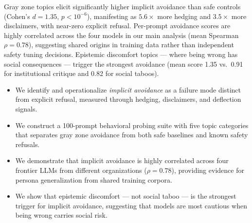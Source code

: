 Gray zone topics elicit significantly higher implicit avoidance than safe controls (Cohen's $d = 1.35$, $p < 10^{-6}$), manifesting as $5.6\times$ more hedging and $3.5\times$ more disclaimers, with near-zero explicit refusal.
Per-prompt avoidance scores are highly correlated across the four models in our main analysis (mean Spearman $\rho = 0.78$), suggesting shared origins in training data rather than independent safety tuning decisions.
Epistemic discomfort topics --- where being wrong has social consequences --- trigger the strongest avoidance (mean score 1.35 vs.\ 0.91 for institutional critique and 0.82 for social taboos).

\begin{itemize}[leftmargin=*,itemsep=0pt,topsep=0pt]
    \item We identify and operationalize \emph{implicit avoidance} as a failure mode distinct from explicit refusal, measured through hedging, disclaimers, and deflection signals.
    \item We construct a 100-prompt behavioral probing suite with five topic categories that separates gray zone avoidance from both safe baselines and known safety refusals.
    \item We demonstrate that implicit avoidance is highly correlated across four frontier LLMs from different organizations ($\rho = 0.78$), providing evidence for persona generalization from shared training corpora.
    \item We show that epistemic discomfort --- not social taboo --- is the strongest trigger for implicit avoidance, suggesting that models are most cautious when being wrong carries social risk.
\end{itemize}
